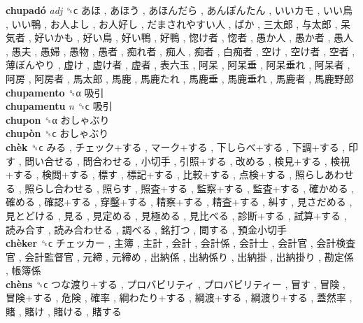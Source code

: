 \textbf{chupadó} \emph{adj}  ␝ϲ   あほ ,  あほう ,  あほんだら ,  あんぽんたん ,  いいカモ ,  いい鳥 ,  いい鴨 ,  お人よし ,  お人好し ,  だまされやすい人 ,  ばか ,  三太郎 ,  与太郎 ,  呆気者 ,  好いかも ,  好い鳥 ,  好い鴨 ,  好鴨 ,  惚け者 ,  惚者 ,  愚か人 ,  愚か者 ,  愚人 ,  愚夫 ,  愚婦 ,  愚物 ,  愚者 ,  痴れ者 ,  痴人 ,  痴者 ,  白痴者 ,  空け ,  空け者 ,  空者 ,  薄ぼんやり ,  虚け ,  虚け者 ,  虚者 ,  表六玉 ,  阿呆 ,  阿呆垂 ,  阿呆垂れ ,  阿呆者 ,  阿房 ,  阿房者 ,  馬太郎 ,  馬鹿 ,  馬鹿たれ ,  馬鹿垂 ,  馬鹿垂れ ,  馬鹿者 ,  馬鹿野郎   \\
\textbf{chupamento} ␝α   吸引   \\
\textbf{chupamentu} \emph{n}  ␝ϲ   吸引   \\
\textbf{chupon} ␝α   おしゃぶり   \\
\textbf{chupòn} ␝ϲ   おしゃぶり   \\
\textbf{chèk} ␝ϲ   みる ,  チェック+する ,  マーク+する ,  下しらべ+する ,  下調+する ,  印す ,  問い合せる ,  問合わせる ,  小切手 ,  引照+する ,  改める ,  検見+する ,  検視+する ,  検閲+する ,  標す ,  標記+する ,  比較+する ,  点検+する ,  照らしあわせる ,  照らし合わせる ,  照らす ,  照査+する ,  監察+する ,  監査+する ,  確かめる ,  確める ,  確認+する ,  穿鑿+する ,  精察+する ,  精査+する ,  糾す ,  見さだめる ,  見とどける ,  見る ,  見定める ,  見極める ,  見比べる ,  診断+する ,  試算+する ,  読み合す ,  読み合わせる ,  調べる ,  銘打つ ,  閲する ,  預金小切手   \\
\textbf{chèker} ␝ϲ   チェッカー ,  主簿 ,  主計 ,  会計 ,  会計係 ,  会計士 ,  会計官 ,  会計検査官 ,  会計監督官 ,  元締 ,  元締め ,  出納係 ,  出納係り ,  出納掛 ,  出納掛り ,  勘定係 ,  帳簿係   \\
\textbf{chèns} ␝ϲ   つな渡り+する ,  プロバビリティ ,  プロバビリティー ,  冒す ,  冒険 ,  冒険+する ,  危険 ,  確率 ,  綱わたり+する ,  綱渡+する ,  綱渡り+する ,  蓋然率 ,  賭 ,  賭け ,  賭ける ,  賭する   \\
